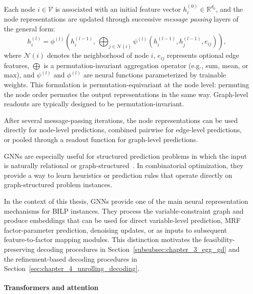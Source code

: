 Each node $i \in \mathcal{V}$ is associated with an initial feature vector $h_i^{(0)} \in \mathbb{R}^{d_0}$, and the node representations are updated through successive \emph{message passing} layers of the general form:
\begin{equation}
    h_i^{(l)} = \phi^{(l)} \!\left( h_i^{(l-1)}, \, \bigoplus_{j \in \mathcal{N}(i)} \psi^{(l)}(h_i^{(l-1)}, h_j^{(l-1)}, e_{ij}) \right),
    \label{eq:gnn_message_passing}
\end{equation}
where $\mathcal{N}(i)$ denotes the neighborhood of node $i$, $e_{ij}$ represents optional edge features, $\bigoplus$ is a permutation-invariant aggregation operator (e.g., sum, mean, or max), and $\psi^{(l)}$ and $\phi^{(l)}$ are neural functions parameterized by trainable weights. This formulation is permutation-equivariant at the node level: permuting the node order permutes the output representations in the same way. Graph-level readouts are typically designed to be permutation-invariant.

After several message-passing iterations, the node representations can be used directly for node-level predictions, combined pairwise for edge-level predictions, or pooled through a readout function for graph-level predictions.

GNNs are especially useful for structured prediction problems in which the input is naturally relational or graph-structured~\cite{gilmer_neural_2017,battaglia_relational_2018}. In combinatorial optimization, they provide a way to learn heuristics or prediction rules that operate directly on graph-structured problem instances.

In the context of this thesis, GNNs provide one of the main neural representation mechanisms for BILP instances. They process the variable-constraint graph and produce embeddings that can be used for direct variable-level prediction, MRF factor-parameter prediction, denoising updates, or as inputs to subsequent feature-to-factor mapping modules. This distinction motivates the feasibility-preserving decoding procedures in Section~\ref{subsubsec:chapter_3_egg_gd} and the refinement-based decoding procedures in Section~\ref{sec:chapter_4_unrolling_decoding}.

\paragraph{Transformers and attention}

